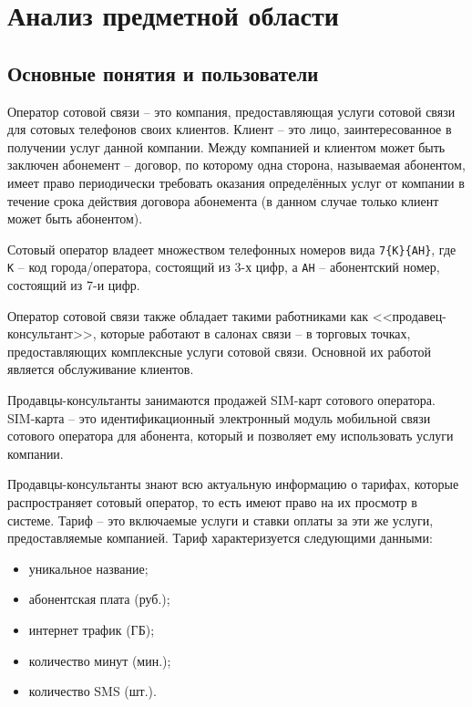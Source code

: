 \section{Анализ предметной области}\label{sec:domain-analysis}




\subsection{Основные понятия и пользователи}


Оператор сотовой связи -- это компания, предоставляющая услуги сотовой связи для сотовых телефонов своих клиентов. Клиент -- это лицо, заинтересованное в получении услуг данной компании. Между компанией и клиентом может быть заключен абонемент -- договор, по которому одна сторона, называемая абонентом, имеет право периодически требовать оказания определённых услуг от компании в течение срока действия договора абонемента (в данном случае только клиент может быть абонентом).

Сотовый оператор владеет множеством телефонных номеров вида \texttt{7\{К\}\{АН\}}, где \texttt{К} -- код города/оператора, состоящий из 3-х цифр, а \texttt{АН} -- абонентский номер, состоящий из 7-и цифр.

Оператор сотовой связи также обладает такими работниками как <<продавец-консультант>>, которые работают в салонах связи -- в торговых точках, предоставляющих комплексные услуги сотовой связи. Основной их работой является обслуживание клиентов.

Продавцы-консультанты занимаются продажей SIM-карт сотового оператора. SIM-карта -- это идентификационный электронный модуль мобильной связи сотового оператора для абонента, который и позволяет ему использовать услуги компании.

Продавцы-консультанты знают всю актуальную информацию о тарифах, которые распространяет сотовый оператор, то есть имеют право на их просмотр в системе. Тариф -- это включаемые услуги и ставки оплаты за эти же услуги, предоставляемые компанией. Тариф характеризуется следующими данными:
\begin{itemize}
    \item уникальное название;
    \item абонентская плата (руб.);
    \item интернет трафик (ГБ);
    \item количество минут (мин.);
    \item количество SMS (шт.).
\end{itemize}

